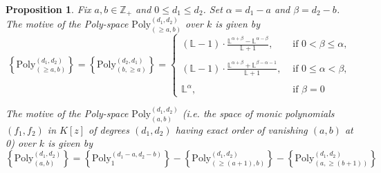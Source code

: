 \documentclass[a4paper,12pt]{amsart}
\newtheorem{prop}[thm]{Proposition}
\theoremstyle{definition}
\newcommand{\bZ}{\mathbb{Z}}
\newcommand{\Lb}{\mathbb{L}}
\begin{document}
	
	\begin{prop}
		\label{prop:poly_m, Pc(4,6)}
		Fix $a,b \in \bZ_{+}$ and $0 \le d_1 \le d_2$. Set $\alpha = d_1 - a$ and $\beta = d_2 - b$. The motive of the Poly-space $\mathrm{Poly}_{(\ge a,b)}^{(d_1, d_2)}$ over $k$ is given by 
		\[ \left\{\mathrm{Poly}_{(\ge a,b)}^{(d_1, d_2)}\right\} = 
		\left\{\mathrm{Poly}_{(b, \ge a)}^{(d_2, d_1)}\right\} = 
		\begin{cases}
			(\Lb-1) \cdot \frac{ \Lb^{\alpha + \beta} - \Lb^{\alpha - \beta} }{ \Lb + 1 }, & \text{ if } 0 < \beta\leq\alpha,  \\\\
			(\Lb-1) \cdot \frac{ \Lb^{\alpha + \beta} + \Lb^{\beta - \alpha - 1} }{ \Lb + 1 }, & \text{ if }  0\leq\alpha<\beta,  \\\\
			\Lb^\alpha, & \text{ if } \beta=0
		\end{cases}
		\]
		
		The motive of the Poly-space $\mathrm{Poly}_{(a,b)}^{(d_1, d_2)}$ (i.e. the space of monic polynomials $(f_1,f_2)$ in $K[z]$ of degrees $(d_1, d_2)$ having exact order of vanishing $(a,b)$ at 0) over $k$ is given by 
		\[ \left\{\mathrm{Poly}_{(a,b)}^{(d_1, d_2)}\right\} = \left\{\mathrm{Poly}_{1}^{(d_1-a, d_2-b)}\right\} - \left\{\mathrm{Poly}_{(\ge (a+1),b)}^{(d_1, d_2)}\right\} - \left\{\mathrm{Poly}_{(a,\ge (b+1))}^{(d_1, d_2)} \right\} 
		\]
	\end{prop}
	
\end{document}
